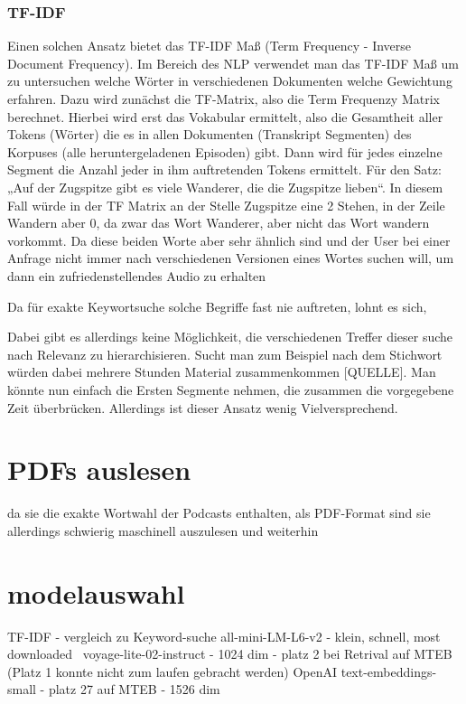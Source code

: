 \subsubsection{TF-IDF}

Einen solchen Ansatz bietet das TF-IDF Maß (Term Frequency - Inverse Document Frequency). 
Im Bereich des NLP verwendet man das TF-IDF Maß um zu untersuchen welche Wörter in verschiedenen Dokumenten welche Gewichtung erfahren. 
Dazu wird zunächst die TF-Matrix, also die Term Frequenzy Matrix berechnet. 
Hierbei wird erst das Vokabular ermittelt, also die Gesamtheit aller Tokens (Wörter) die es in allen Dokumenten (Transkript Segmenten) des Korpuses (alle heruntergeladenen Episoden) gibt. 
Dann wird für jedes einzelne Segment die Anzahl jeder in ihm auftretenden Tokens ermittelt. 
Für den Satz: „Auf der Zugspitze gibt es viele Wanderer, die die Zugspitze lieben“. 
In diesem Fall würde in der TF Matrix an der Stelle Zugspitze eine 2 Stehen, in der Zeile Wandern aber 0, da zwar das Wort Wanderer, aber nicht das Wort wandern vorkommt. 
Da diese beiden Worte aber sehr ähnlich sind und der User bei einer Anfrage nicht immer nach verschiedenen Versionen eines Wortes suchen will, um dann ein zufriedenstellendes Audio zu erhalten

Da für exakte Keywortsuche solche Begriffe fast nie auftreten, lohnt es sich, 


Dabei gibt es allerdings keine Möglichkeit, die verschiedenen Treffer dieser suche nach Relevanz zu hierarchisieren. Sucht man zum Beispiel nach dem Stichwort  würden dabei mehrere Stunden Material zusammenkommen [QUELLE]. 
Man könnte nun einfach die Ersten Segmente nehmen, die zusammen die vorgegebene Zeit überbrücken. 
Allerdings ist dieser Ansatz wenig Vielversprechend. 

\section{PDFs auslesen}
da sie die exakte Wortwahl der Podcasts enthalten, als PDF-Format sind sie allerdings schwierig maschinell auszulesen und weiterhin


\section{modelauswahl}
TF-IDF - vergleich zu Keyword-suche
all-mini-LM-L6-v2 - klein, schnell, most downloaded~\cite{2024}
voyage-lite-02-instruct - 1024 dim - platz 2 bei Retrival auf MTEB (Platz 1 konnte nicht zum laufen gebracht werden) 
OpenAI text-embeddings-small - platz 27 auf MTEB - 1526 dim 

